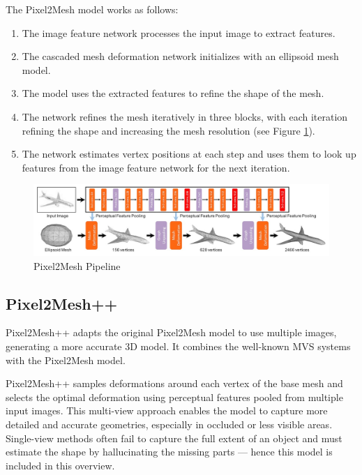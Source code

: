 The Pixel2Mesh model works as follows:
\begin{enumerate}
    \item The image feature network processes the input image to extract features.
    \item The cascaded mesh deformation network initializes with an ellipsoid mesh model.
    \item The model uses the extracted features to refine the shape of the mesh.
    \item The network refines the mesh iteratively in three blocks, with each iteration refining the shape and increasing the mesh resolution (see Figure \ref{fig:pixel2mesh}).
    \item The network estimates vertex positions at each step and uses them to look up features from the image feature network for the next iteration.
\end{enumerate}

\begin{figure}
    \centering
    \includegraphics[width=1\linewidth]{images/pixel2mesh.jpg}
    \caption{Pixel2Mesh Pipeline \autocite{wang_pixel2mesh_2018}}
    \label{fig:pixel2mesh}
\end{figure}


\subsection{Pixel2Mesh++} \label{section:pixel2meshpp}
Pixel2Mesh++ \autocite{wen_pixel2mesh_2019} adapts the original Pixel2Mesh model to use multiple images, generating a more accurate 3D model. It combines the well-known MVS systems with the Pixel2Mesh model.

Pixel2Mesh++ samples deformations around each vertex of the base mesh and selects the optimal deformation using perceptual features pooled from multiple input images. This multi-view approach enables the model to capture more detailed and accurate geometries, especially in occluded or less visible areas. Single-view methods often fail to capture the full extent of an object and must estimate the shape by hallucinating the missing parts — hence this model is included in this overview.

